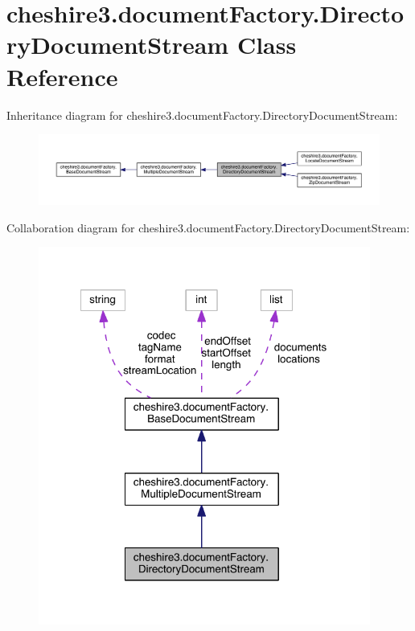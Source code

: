\hypertarget{classcheshire3_1_1document_factory_1_1_directory_document_stream}{\section{cheshire3.\-document\-Factory.\-Directory\-Document\-Stream Class Reference}
\label{classcheshire3_1_1document_factory_1_1_directory_document_stream}
}


Inheritance diagram for cheshire3.\-document\-Factory.\-Directory\-Document\-Stream\-:
\nopagebreak
\begin{figure}[H]
\begin{center}
\leavevmode
\includegraphics[width=350pt]{classcheshire3_1_1document_factory_1_1_directory_document_stream__inherit__graph}
\end{center}
\end{figure}


Collaboration diagram for cheshire3.\-document\-Factory.\-Directory\-Document\-Stream\-:
\nopagebreak
\begin{figure}[H]
\begin{center}
\leavevmode
\includegraphics[width=309pt]{classcheshire3_1_1document_factory_1_1_directory_document_stream__coll__graph}
\end{center}
\end{figure}

